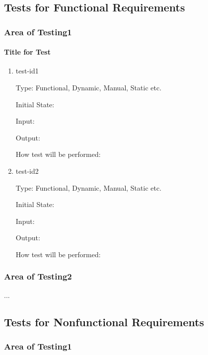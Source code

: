 \documentclass[12pt, titlepage]{article}
\begin{document}
	\subsection{Tests for Functional Requirements}

		\subsubsection{Area of Testing1}
				
		\paragraph{Title for Test}

		\begin{enumerate}

			\item{test-id1\\}

			Type: Functional, Dynamic, Manual, Static etc.
								
			Initial State: 
								
			Input: 
								
			Output: 
								
			How test will be performed: 
								
			\item{test-id2\\}

			Type: Functional, Dynamic, Manual, Static etc.
								
			Initial State: 
								
			Input: 
								
			Output: 
								
			How test will be performed: 

		\end{enumerate}

	\subsubsection{Area of Testing2}

	...

	\subsection{Tests for Nonfunctional Requirements}

	\subsubsection{Area of Testing1}
			
\end{document}
